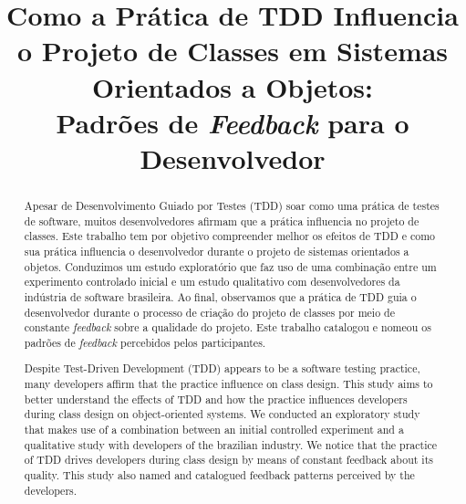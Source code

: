 \documentclass[conference]{IEEEtran}
\begin{document}
	
\title{Como a Prática de TDD Influencia o Projeto de Classes em Sistemas Orientados a Objetos: \\Padrões de \textit{Feedback} para o Desenvolvedor}

\author{
}

\maketitle


\begin{abstract} 
	Apesar de Desenvolvimento Guiado por Testes (TDD) soar como uma prática de testes de software, 
	muitos desenvolvedores afirmam que a prática influencia no projeto de classes.
	Este trabalho tem por objetivo compreender melhor os efeitos de TDD e como sua prática 
	influencia o desenvolvedor durante o projeto de sistemas orientados a objetos.
	Conduzimos um estudo exploratório que faz uso de uma combinação entre um experimento controlado 
	inicial e um estudo qualitativo com desenvolvedores da indústria de software brasileira.
	Ao final, observamos que a prática de TDD guia o desenvolvedor durante o processo
	de criação do projeto de classes por meio de constante \textit{feedback} sobre a qualidade
	do projeto. Este trabalho catalogou e nomeou os padrões de
	\textit{feedback} percebidos pelos participantes.
\end{abstract}

\vspace{0.2cm}

\begin{abstract} 
	Despite Test-Driven Development (TDD) appears to be a software testing practice, 
	many developers affirm that the practice influence on class design. This study aims
	to better understand the effects of TDD and how the practice influences developers
	during class design on object-oriented systems. We conducted an exploratory study that makes
	use of a combination between an initial controlled experiment and a qualitative study
	with developers of the brazilian industry. We notice that the practice of TDD drives
	developers during class design by means of constant feedback about its quality. This study
	also named and catalogued feedback patterns perceived by the developers.
\end{abstract}
\end{document}
